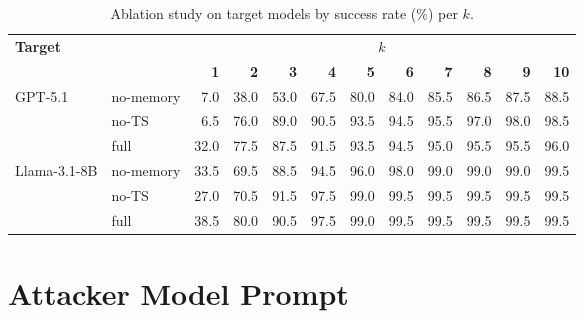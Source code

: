 \documentclass[11pt]{article}
\begin{document}
\begin{table}[htbp]
  \centering
  \caption{Ablation study on target models by success rate (\%) per $k$.}
  \label{tab:ablation_full}
  \footnotesize
  \begin{tabular}{@{}llrrrrrrrrrr@{}} \toprule
    \multirow{2}{*}{\textbf{Target}} &           & \multicolumn{10}{c}{\bfseries\boldmath $k$}                                                                                                                       \\ \cmidrule(lr){3-12}
                                     &           & \textbf{1}                                  & \textbf{2} & \textbf{3} & \textbf{4} & \textbf{5} & \textbf{6} & \textbf{7} & \textbf{8} & \textbf{9} & \textbf{10} \\ \midrule
    \multirow{3}{*}{GPT-5.1}
                                     & no-memory & 7.0                                         & 38.0       & 53.0       & 67.5       & 80.0       & 84.0       & 85.5       & 86.5       & 87.5       & 88.5        \\
                                     & no-TS     & 6.5                                         & 76.0       & 89.0       & 90.5       & 93.5       & 94.5       & 95.5       & 97.0       & 98.0       & 98.5        \\
                                     & full      & 32.0                                        & 77.5       & 87.5       & 91.5       & 93.5       & 94.5       & 95.0       & 95.5       & 95.5       & 96.0        \\ \midrule
    \multirow{3}{*}{Llama-3.1-8B}
                                     & no-memory & 33.5                                        & 69.5       & 88.5       & 94.5       & 96.0       & 98.0       & 99.0       & 99.0       & 99.0       & 99.5        \\
                                     & no-TS     & 27.0                                        & 70.5       & 91.5       & 97.5       & 99.0       & 99.5       & 99.5       & 99.5       & 99.5       & 99.5        \\
                                     & full      & 38.5                                        & 80.0       & 90.5       & 97.5       & 99.0       & 99.5       & 99.5       & 99.5       & 99.5       & 99.5        \\ \bottomrule
  \end{tabular}
\end{table}

\section{Attacker Model Prompt}
\label{app:attack_prompt}
\end{document}
